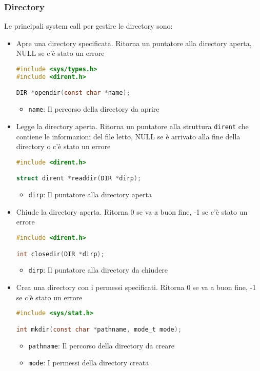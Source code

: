 \documentclass[a4paper]{article}
\begin{document}
\subsubsection{Directory}
Le principali system call per gestire le directory sono:
\begin{itemize}
\item Apre una directory specificata. Ritorna un puntatore alla directory aperta,
  NULL se c'è stato un errore
\begin{lstlisting}[language=C]
#include <sys/types.h>
#include <dirent.h>

DIR *opendir(const char *name);
\end{lstlisting}
  \begin{itemize}
    \item \texttt{name}: Il percorso della directory da aprire
  \end{itemize}

\item Legge la directory aperta. Ritorna un puntatore alla struttura \texttt{dirent}
  che contiene le informazioni del file letto, NULL se è arrivato alla fine della
  directory o c'è stato un errore
\begin{lstlisting}[language=C]
#include <dirent.h>

struct dirent *readdir(DIR *dirp);
\end{lstlisting}
  \begin{itemize}
    \item \texttt{dirp}: Il puntatore alla directory aperta
  \end{itemize}

\item Chiude la directory aperta. Ritorna 0 se va a buon fine, -1 se c'è stato un errore
\begin{lstlisting}[language=C]
#include <dirent.h>

int closedir(DIR *dirp);
\end{lstlisting}
  \begin{itemize}
    \item \texttt{dirp}: Il puntatore alla directory da chiudere
  \end{itemize}

\item Crea una directory con i permessi specificati. Ritorna 0 se va a buon fine,
  -1 se c'è stato un errore
\begin{lstlisting}[language=C]
#include <sys/stat.h>

int mkdir(const char *pathname, mode_t mode);
\end{lstlisting}
  \begin{itemize}
    \item \texttt{pathname}: Il percorso della directory da creare
    \item \texttt{mode}: I permessi della directory creata
  \end{itemize}


\end{itemize}
\end{document}
